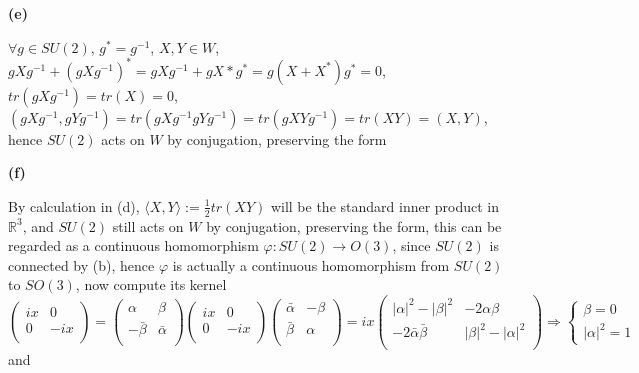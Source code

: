 \documentclass[10pt]{article}
\newcommand{\<}[1]{\langle #1 \rangle}
\begin{document}
\textbf{(e)} \par
$\forall g\in SU(2)$, $g^*=g^{-1}$, $X,Y\in W$, $gXg^{-1}+(gXg^{-1})^*=gXg^{-1}+gX*g^*=g(X+X^*)g^*=0$, $tr(gXg^{-1})=tr(X)=0$, $(gXg^{-1},gYg^{-1})=tr(gXg^{-1}gYg^{-1})=tr(gXYg^{-1})=tr(XY)=(X,Y)$, hence $SU(2)$ acts on $W$ by conjugation, preserving the form \par
\textbf{(f)} \par
By calculation in (d), $\<{X,Y}:=\frac{1}{2}tr(XY)$ will be the standard inner product in $\mathbb{R}^3$, and $SU(2)$ still acts on $W$ by conjugation, preserving the form, this can be regarded as a continuous homomorphism $\varphi:SU(2)\rightarrow O(3)$, since $SU(2)$ is connected by (b), hence $\varphi$ is actually a continuous homomorphism from $SU(2)$ to $SO(3)$, now compute its kernel
$$
\left( {\begin{array}{cc}
   ix &0  \\
    0 & -ix \\
  \end{array} } \right)=\left( {\begin{array}{cc}
   \alpha &\beta  \\
    -\bar\beta & \bar\alpha \\
  \end{array} } \right)\left( {\begin{array}{cc}
   ix &0  \\
    0 & -ix \\
  \end{array} } \right)\left( {\begin{array}{cc}
   \bar\alpha & -\beta  \\
    \bar\beta & \alpha \\
  \end{array} } \right)=ix\left( {\begin{array}{cc}
   |\alpha|^2-|\beta|^2 &-2\alpha\beta  \\
    -2\bar\alpha\bar\beta & |\beta|^2-|\alpha|^2 \\
  \end{array} } \right)\Rightarrow \begin{cases}
  \beta=0 \\
  |\alpha|^2=1
  \end{cases}
$$
and 
\end{document}
